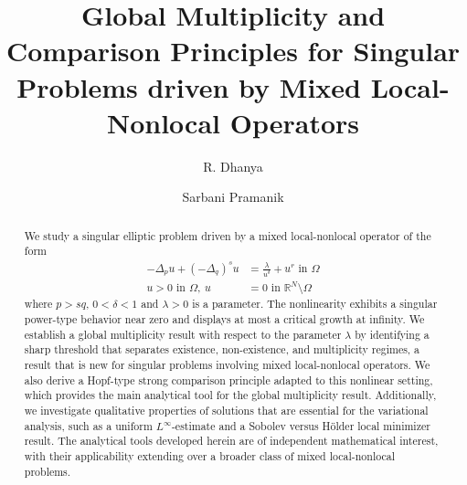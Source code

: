 \documentclass[reqno,oneside]{amsart}
\theoremstyle{definition}
\theoremstyle{remark}
\numberwithin{equation}{section}
\newcommand{\Om} {\Omega}
\newcommand{\p}{\Delta_p}
\newcommand{\qs}{(-\Delta_q)^s}
\newcommand{\bdry}{\mathbb{R}^N \setminus \Omega}
\newcommand{\la} {\lambda}
\begin{document}
\title[Global Multiplicity and Comparison Principles]{Global Multiplicity and Comparison Principles for Singular Problems driven by Mixed Local-Nonlocal Operators}


\author{R. Dhanya}

\author{Sarbani Pramanik}

\address{School of Mathematics, Indian Institute of Science Education and Research Thiruvananthapuram, Maruthamala, Thiruvananthapuram, Kerala, 695551, India.}



\begin{abstract}

We study a singular elliptic problem driven by a mixed local-nonlocal operator of the form
\begin{equation*}
    \begin{aligned}
        -\p u + \qs u &= \frac{\la}{u^{\delta}} + u^r \text{ in } \Om\\
        u>0 \text{ in } \Om,\ u &=0 \text{ in } \bdry
    \end{aligned}
\end{equation*}
where $p > sq$, $0<\delta<1$ and $\lambda > 0$ is a parameter. The nonlinearity exhibits a singular power-type behavior near zero and displays at most a critical growth at infinity. We establish a global multiplicity result with respect to the parameter $\lambda$ by identifying a sharp threshold that separates existence, non-existence, and multiplicity regimes, a result that is new for singular problems involving mixed local-nonlocal operators. We also derive a Hopf-type strong comparison principle adapted to this nonlinear setting, which provides the main analytical tool for the global multiplicity result. Additionally, we investigate qualitative properties of solutions that are essential for the variational analysis, such as a uniform $L^{\infty}$-estimate and a Sobolev versus H\"older local minimizer result. The analytical tools developed herein are of independent mathematical interest, with their applicability extending over a broader class of mixed local-nonlocal problems.

\end{abstract}
\end{document}
